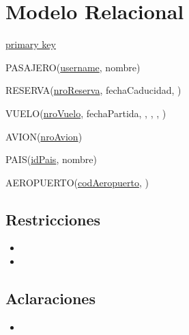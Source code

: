 \section{Modelo Relacional}

\begin{framed} \centering
  \underline{primary key} \hspace*{3cm}
\end{framed}

\vspace*{0.5cm}
\noindent
PASAJERO(\underline{username}, nombre)

\vspace*{0.5cm}
\noindent
RESERVA(\underline{nroReserva}, fechaCaducidad, )

\vspace*{0.5cm}
\noindent
VUELO(\underline{nroVuelo}, fechaPartida, , , , )

\vspace*{0.5cm}
\noindent
AVION(\underline{nroAvion})

\vspace*{0.5cm}
\noindent
PAIS(\underline{idPais}, nombre)

\vspace*{0.5cm}
\noindent
AEROPUERTO(\underline{codAeropuerto}, )

\subsection{Restricciones}
\begin{itemize}
  \item
  
  \item
\end{itemize}

\subsection{Aclaraciones}
\begin{itemize}
  \item

\end{itemize}
